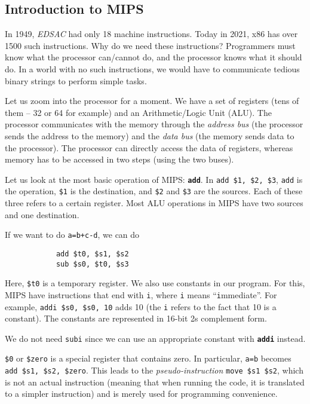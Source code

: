 \documentclass{article}
\begin{document}
	\subsection{Introduction to MIPS}

		In 1949, \emph{EDSAC} had only 18 machine instructions. Today in 2021, x86 has over 1500 such instructions. Why do we need these instructions? Programmers must know what the processor can/cannot do, and the processor knows what it should do. In a world with no such instructions, we would have to communicate tedious binary strings to perform simple tasks. 

		Let us zoom into the processor for a moment. We have a set of registers (tens of them -- 32 or 64 for example) and an Arithmetic/Logic Unit (ALU). The processor communicates with the memory through the \emph{address bus} (the processor sends the address to the memory) and the \emph{data bus} (the memory sends data to the processor). The processor can directly access the data of registers, whereas memory has to be accessed in two steps (using the two buses).

		Let us look at the most basic operation of MIPS: \textbf{\texttt{add}}. In \texttt{add \$1, \$2, \$3}, \texttt{add} is the operation, \texttt{\$1} is the destination, and \texttt{\$2} and \texttt{\$3} are the sources. Each of these three refers to a certain register. Most ALU operations in MIPS have two sources and one destination.

		If we want to do \texttt{a=b+c-d}, we can do
		\begin{verbatim}
			add $t0, $s1, $s2
			sub $s0, $t0, $s3
		\end{verbatim}
		Here, \texttt{\$t0} is a temporary register. We also use constants in our program. For this, MIPS have instructions that end with \texttt{i}, where \texttt{i} means ``\texttt{i}mmediate''. For example, \texttt{addi \$s0, \$s0, 10} adds 10 (the \texttt{i} refers to the fact that 10 is a constant). The constants are represented in 16-bit 2s complement form.

		We do not need \texttt{subi} since we can use an appropriate constant with \textbf{\texttt{addi}} instead.

		\texttt{\$0} or \texttt{\$zero} is a special register that contains zero. In particular, \texttt{a=b} becomes \texttt{add \$s1, \$s2, \$zero}.
		This leads to the \emph{pseudo-instruction} \texttt{move \$s1 \$s2}, which is not an actual instruction (meaning that when running the code, it is translated to a simpler instruction) and is merely used for programming convenience.
\end{document}
